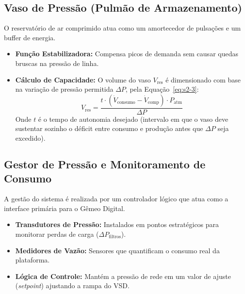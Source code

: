 \documentclass[12pt,a4paper]{article}
\numberwithin{equation}{section}
\numberwithin{table}{section}
\numberwithin{figure}{section}
\begin{document}
{	\subsection{\textbf{Vaso de Pressão (Pulmão de Armazenamento)}}
	O reservatório de ar comprimido atua como um amortecedor de pulsações e um buffer de energia.
	\begin{itemize}
		\item \textbf{Função Estabilizadora:} Compensa picos de demanda sem causar quedas bruscas na pressão de linha.
		\item \textbf{Cálculo de Capacidade:} O volume do vaso $V_{\text{res}}$ é dimensionado com base na variação de pressão permitida $\Delta P$, pela Equação~\eqref{eq:s2-3}:
		\begin{equation}\label{eq:s2-3}
 V_{\text{res}} = \frac{t \cdot (\dot{V}_{\text{consumo}} - \dot{V}_{\text{comp}}) \cdot P_{\text{atm}}}{\Delta P} 
\end{equation}
		Onde $t$ é o tempo de autonomia desejado (intervalo em que o vaso deve sustentar sozinho o déficit entre consumo e produção antes que $\Delta P$ seja excedido).
	\end{itemize}
	
	\subsection{\textbf{Gestor de Pressão e Monitoramento de Consumo}}
	A gestão do sistema é realizada por um controlador lógico que atua como a interface primária para o Gêmeo Digital.
	\begin{itemize}
		\item \textbf{Transdutores de Pressão:} Instalados em pontos estratégicos para monitorar perdas de carga ($\Delta P_{\text{filtros}}$).
		\item \textbf{Medidores de Vazão:} Sensores que quantificam o consumo real da plataforma.
		\item \textbf{Lógica de Controle:} Mantém a pressão de rede em um valor de ajuste (\textit{setpoint}) ajustando a rampa do VSD.
	\end{itemize}

}
\end{document}
